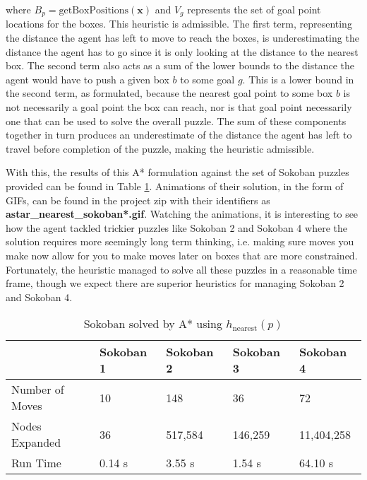 \documentclass{article}[12pt]
\begin{document}
	where $B_p = \text{getBoxPositions}\left(\boldsymbol{x}\right)$ and $V_g$ represents the set of goal point locations for the boxes. This heuristic is admissible. The first term, representing the distance the agent has left to move to reach the boxes, is underestimating the distance the agent has to go since it is only looking at the distance to the nearest box. The second term also acts as a sum of the lower bounds to the distance the agent would have to push a given box $b$ to some goal $g$. This is a lower bound in the second term, as formulated, because the nearest goal point to some box $b$ is not necessarily a goal point the box can reach, nor is that goal point necessarily one that can be used to solve the overall puzzle. The sum of these components together in turn produces an underestimate of the distance the agent has left to travel before completion of the puzzle, making the heuristic admissible.
	
	With this, the results of this A* formulation against the set of Sokoban puzzles provided can be found in Table \ref{tab:sokastar}. Animations of their solution, in the form of GIFs, can be found in the project zip with their identifiers as \textbf{astar\_nearest\_sokoban*.gif}. Watching the animations, it is interesting to see how the agent tackled trickier puzzles like Sokoban 2 and Sokoban 4 where the solution requires more seemingly long term thinking, i.e. making sure moves you make now allow for you to make moves later on boxes that are more constrained. Fortunately, the heuristic managed to solve all these puzzles in a reasonable time frame, though we expect there are superior heuristics for managing Sokoban 2 and Sokoban 4.
	
	\begin{table}[ht]
   \centering
   \begin{tabular}{l | l | l | l | l }
   \hline
    & Sokoban 1 & Sokoban 2 & Sokoban 3 & Sokoban 4\\
    \hline \hline 
   Number of Moves & 10 & 148 & 36 & 72 \\
   Nodes Expanded & 36 & 517,584 & 146,259 & 11,404,258\\
   Run Time & 0.14 s & 3.55 s & 1.54 s & 64.10 s\\
   \hline
   \end{tabular}
   \caption{Sokoban solved by A* using $h_{\text{nearest}}(p)$} \label{tab:sokastar}
   \end{table}
   
   
\end{document}
